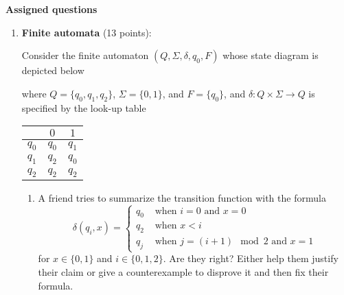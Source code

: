 {\bf Assigned questions}
\begin{enumerate}[wide, labelwidth=!, labelindent=0pt]
\item\textbf{Finite automata} (13 points):

Consider the finite automaton $(Q, \Sigma, \delta, q_0, F)$ whose state diagram is depicted below
\begin{center}
\end{center}
where $Q = \{q_0, q_1, q_2\}$, $\Sigma = \{0,1\}$, and $F = \{q_0\}$, and $\delta: Q \times \Sigma \to Q$
is specified by the look-up table
\begin{center}
\begin{tabular}{c|cc}
        & $0$ & $1$ \\
    \hline
  $q_0$ & $q_0$ & $q_1$ \\
  $q_1$ & $q_2$ & $q_0$ \\
  $q_2$ & $q_2$ & $q_2$
\end{tabular}
\end{center}
    \begin{enumerate}
    \item\gradeComplete A friend tries to summarize the transition function with the formula
    \[
        \delta(q_i,x) = \begin{cases}
            q_0 &\text{ when $i=0$ and $x=0$} \\
            q_2 &\text{ when $x < i$}\\
            q_j &\text{ when $j = (i+1) \mod 2$ and $x=1$}
        \end{cases}
    \]
    for $x \in \{0,1\}$ and $i \in \{0,1,2\}$.
    Are they right? Either help them justify their claim or give a counterexample to disprove it and then 
    fix their formula.


\end{enumerate}
\end{enumerate}
